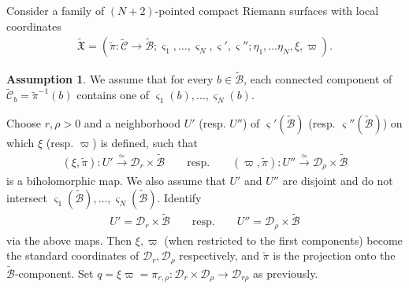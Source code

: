 \documentclass[12pt,a4paper,notitlepage]{article}
\theoremstyle{definition}
\newtheorem{ass}[df]{Assumption}
\theoremstyle{plain}
\newcommand{\fk}{\mathfrak}
\newcommand{\mc}{\mathcal}
\newcommand{\wtd}{\widetilde}
\newcommand{\sgm}{\varsigma}
\numberwithin{equation}{section}
\begin{document}
Consider a family of $(N+2)$-pointed compact Riemann surfaces with local coordinates
\begin{align}
\wtd{\fk X}=(\wtd\pi:\wtd{\mc C}\rightarrow\wtd{\mc B};\sgm_1,\dots,\sgm_N,\sgm',\sgm'';\eta_1,\dots\eta_N,\xi,\varpi).
\end{align}
\begin{ass}\label{lb62}
We assume that for every $b\in\wtd{\mc B}$, each connected component of  $\wtd{\mc C}_b=\wtd\pi^{-1}(b)$ contains one of $\sgm_1(b),\dots,\sgm_N(b)$.
\end{ass}
Choose $r,\rho>0$ and a neighborhood $U'$ (resp. $U''$) of $\sgm'(\wtd {\mc B})$ (resp. $\sgm''(\wtd {\mc B})$) on which $\xi$ (resp. $\varpi$) is defined, such that 
\begin{gather}
(\xi,\wtd\pi):U'\xrightarrow{\simeq} \mc D_{r}\times\wtd{\mc B}\qquad\text{resp.}\qquad (\varpi,\wtd\pi):U''\xrightarrow{\simeq} \mc D_{\rho}\times\wtd{\mc B}\label{eq84}
\end{gather}
is a biholomorphic map. We also assume that $U'$ and $ U''$ are disjoint and do not intersect $\sgm_1(\wtd{\mc B}),\dots,\sgm_N(\wtd{\mc B})$. Identify
\begin{gather*}
U'=\mc D_{r}\times\wtd{\mc B}\qquad\text{resp.}\qquad U''=\mc D_{\rho}\times\wtd{\mc B}
\end{gather*}
via the above maps. Then $\xi,\varpi$ (when restricted to the first components) become the standard coordinates of $\mc D_{r},\mc D_{\rho}$ respectively, and $\wtd\pi$ is the projection onto the $\wtd{\mc B}$-component. Set $q=\xi\varpi=\pi_{r,\rho}:\mc D_{r}\times\mc D_{\rho}\rightarrow\mc D_{r\rho}$ as previously.  
\end{document}
